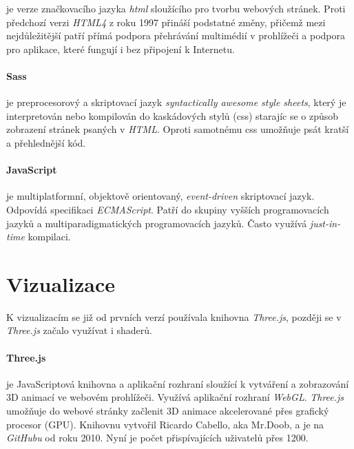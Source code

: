 \documentclass[thesis=B, czech]{FITthesis}[2019/03/06]
\begin{document}
je verze značkovacího jazyka \textit{\gls{html}} sloužícího pro tvorbu webových stránek. Proti předchozí verzi \textit{HTML4} z roku 1997 přináší podstatné změny, přičemž mezi nejdůležitější patří přímá podpora přehrávání multimédií v prohlížeči a podpora pro aplikace, které fungují i bez připojení k Internetu.

\paragraph*{Sass}
je preprocesorový a skriptovací jazyk \textit{syntactically awesome style sheets}, který je interpretován nebo kompilován do kaskádových stylů (\gls{css}) starajíc se o způsob zobrazení stránek psaných v \textit{HTML}. Oproti samotnému \gls{css} umožňuje psát kratší a přehlednější kód.


\paragraph*{JavaScript}

je multiplatformní, objektově orientovaný, \textit{event-driven} skriptovací jazyk. Odpovídá specifikaci \textit{ECMAScript}. Patří do skupiny vyšších programovacích jazyků a multiparadigmatických programovacích jazyků. Často využívá \textit{just-in-time} kompilaci.

\section{Vizualizace}

K vizualizacím se již od prvních verzí používala knihovna \textit{Three.js}, později se v \textit{Three.js} začalo využívat i shaderů.

\paragraph*{Three.js}

je JavaScriptová knihovna a aplikační rozhraní sloužící k vytváření a zobrazování 3D animací ve webovém prohlížeči. Využívá aplikační rozhraní \textit{WebGL}. \textit{Three.js} umožňuje do webové stránky začlenit 3D animace akcelerované přes grafický procesor (GPU). Knihovnu vytvořil Ricardo Cabello, aka Mr.Doob, a je na \textit{GitHubu} od roku 2010. Nyní je počet přispívajících uživatelů přes 1200.

\end{document}
